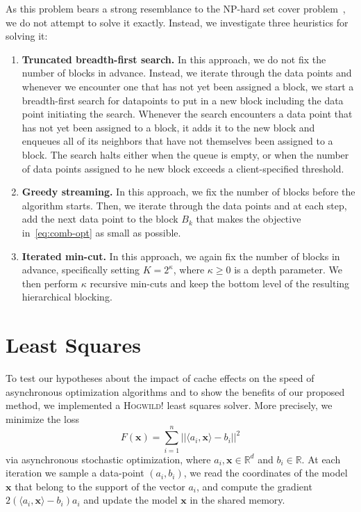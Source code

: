 \documentclass[times,11pt]{article}
\numberwithin{equation}{section}		%
\numberwithin{figure}{section}			%
\numberwithin{table}{section}				%
\newcommand{\ltwonorm}[1]{\left|\left|{#1}\right|\right|}
\newcommand{\xvec}{\mathbf{x}}
\newcommand{\HW}{\textsc{Hogwild!}}
\newcommand{\RR}{\mathbb{R}}
\begin{document}
As this problem bears a strong resemblance to the NP-hard set cover problem~\citep{}, we do not attempt to solve it exactly. Instead, we investigate three heuristics for solving it:
\begin{enumerate}
\item
{\bf Truncated breadth-first search.} In this approach, we do not fix the number of blocks in advance. Instead, we iterate through the data points and whenever we encounter one that has not yet been assigned a block, we start a breadth-first search for datapoints to put in a new block including the data point initiating the 
search. Whenever the search encounters a data point that has not yet been assigned to a block, it adds it to the new block and enqueues all of its neighbors that have not themselves been assigned to a block. The search halts either when the queue is empty, or when the number of data points assigned to he new block
exceeds a client-specified threshold.

\item
{\bf Greedy streaming.} In this approach, we fix the number of blocks before the algorithm starts. Then, we iterate through the data points and at each step, add the next data point to the block $B_{k}$ that makes the objective in~\eqref{eq:comb-opt} as small as possible.
\item
{\bf Iterated min-cut.} In this approach, we again fix the number of blocks in advance, specifically setting $K = 2^{\kappa}$, where $\kappa \geq 0$ is a depth parameter. We then perform $\kappa$ recursive min-cuts and keep the bottom level of the resulting hierarchical blocking.
\end{enumerate}

\section{Least Squares}\label{sec:ls}

To test our hypotheses about the impact of cache effects on the speed of asynchronous optimization algorithms and to show the benefits of our proposed method, we implemented a \HW{} least squares solver. More precisely, we minimize the loss 
\begin{equation}
\label{eq:LS}
F(\xvec) = \sum_{i = 1}^n \ltwonorm{\langle a_i, \xvec \rangle - b_i}^2
\end{equation}
via asynchronous stochastic optimization, where $a_i, \xvec \in \RR^d$ and $b_i\in \RR$. 
At each iteration we sample a data-point $(a_i, b_i)$, we read the coordinates of the model $\xvec$ that belong to the support of the vector $a_i$, and compute the gradient $2(\langle a_i, \xvec\rangle - b_i)a_i$ and update the model $\xvec$ in the shared memory.
\end{document}
